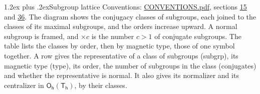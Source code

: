 \documentclass[10pt,a4paper]{article}
\makeatletter
\renewcommand\section{\@startsection{section}{1}{\z@}{-3ex plus -1ex minus -.2ex}%
  {1.2ex plus .2ex}{\normalfont\large\sffamily\bfseries\color{parttitle}}}
\numberwithin{equation}{section}
\newcommand{\grp}[1]{\mathsf{#1}}
\makeatother
\begin{document}
\section{Subgroup lattice}\label{s:subgroups}
Conventions: \href{../../CONVENTIONS.pdf}{CONVENTIONS.pdf}, sections \href{../../../rotation/CONVENTIONS.pdf\#conv.15}{15} and \href{../../CONVENTIONS.pdf\#conv.36}{36}.
The diagram shows the conjugacy classes of subgroups, each joined to the classes of its maximal subgroups, and the orders increase upward. \label{n:index.conjugates.c}\label{n:mark.conjugates}A normal subgroup is framed, and ${\times}c$ is the number $c > 1$ of conjugate subgroups. The table lists the classes by order, then by magnetic type, those of one symbol together. \label{n:head.subgroup}\label{n:head.magnetic.type}\label{n:head.order}\label{n:head.conjugates}\label{n:head.normal}A row gives the representative of a class of subgroups (subgrp), its magnetic type (type), its order, the number of subgroups in the class (conjugates) and whether the representative is normal. \label{n:head.normalizer}\label{n:head.centralizer}It also gives its normalizer and its centralizer in $\grp{O_{h}}(\grp{T_{h}})$, by their classes. 
\end{document}
